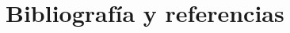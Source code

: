 \documentclass[../main.tex]{subfiles}
\begin{document}
\section{Bibliografía y referencias}
\end{document}
